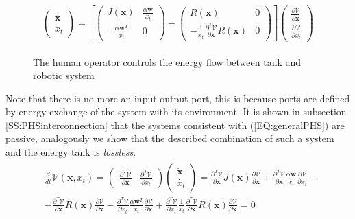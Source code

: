 \documentclass[a4paper,twoside, openright,12pt]{report}
\newcommand{\f}[1]{\boldsymbol{#1}}
\begin{document}
\begin{eqnarray}
\begin{aligned}
\begin{pmatrix}
\dot{\f{x}} \\ \dot{x}_t
\end{pmatrix} =
\left[
\begin{pmatrix}
J(\f{x}) & \frac{\alpha \f{w}}{x_t} \\ -\frac{\alpha \f{w}^T}{x_t} & 0
\end{pmatrix} - 
\begin{pmatrix}
R(\f{x}) & 0 \\ -\frac{1}{x_t}\frac{\partial^T \mathcal{V}}{\partial \f{x}}R(\f{x}) & 0
\end{pmatrix}
\right]
\begin{pmatrix}
\frac{\partial \mathcal{V}}{\partial \f{x}} \\
\frac{\partial \mathcal{V}}{\partial x_t}
\end{pmatrix}
\end{aligned}
\end{eqnarray}

\begin{figure}[b!]
	\centering
	\small
	\def\svgwidth{0.95\columnwidth}
	
	\vspace{10pt}
	\caption{The human operator controls the energy flow between tank and robotic system}
	\label{FIG:energytank}
\end{figure} 

Note that there is no more an input-output port, this is because ports are defined by energy exchange of the system with its environment. It is shown in subsection \ref{SS:PHSinterconnection} that the systems consistent with (\ref{EQ:generalPHS}) are passive, analogously we show that the described combination of such a system and the energy tank is \emph{lossless}.
\begin{eqnarray}
\begin{aligned}
&\frac{d}{dt}\mathcal{V}(\f{x},x_t) = 
\begin{pmatrix}
\frac{\partial^T \mathcal{V}}{\partial \f{x}} & \frac{\partial^T \mathcal{V}}{\partial x_t}
\end{pmatrix}
\begin{pmatrix}
\dot{\f{x}} \\ \dot{x_t}
\end{pmatrix}
= \frac{\partial^T \mathcal{V}}{\partial \f{x}}J(\f{x})\frac{\partial \mathcal{V}}{\partial \f{x}} + \frac{\partial^T \mathcal{V}}{\partial \f{x}}\frac{\alpha \f{w}}{x_t}\frac{\partial \mathcal{V}}{\partial x_t} - \\
&
 -\frac{\partial^T \mathcal{V}}{\partial \f{x}}R(\f{x})\frac{\partial \mathcal{V}}{\partial \f{x}} -\frac{\partial^T \mathcal{V}}{\partial x_t}\frac{\alpha \f{w}^T}{x_t} \frac{\partial \mathcal{V}}{\partial \f{x}} + \frac{\partial^T \mathcal{V}}{\partial x_t}\frac{1}{x_t}\frac{\partial^T \mathcal{V}}{\partial \f{x}}R(\f{x})\frac{\partial \mathcal{V}}{\partial \f{x}} = 0
\end{aligned}
\end{eqnarray}
\end{document}

